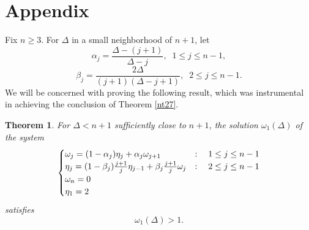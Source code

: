\documentclass[amssymb,amsfonts,12pt]{amsart}
\newtheorem{theorem}{Theorem}[section]
\begin{document}
\section{Appendix}
Fix $n\ge 3$. For $\Delta$ in a small neighborhood of $n+1$, let
$$\alpha_j=\frac{\Delta-(j+1)}{\Delta-j},\;\;1\le j\le n-1,$$
$$\beta_j=\frac{2\Delta}{(j+1)(\Delta-j+1)},\;\;2\le j\le n-1.$$
We will be concerned with proving the following result, which was instrumental in achieving the conclusion of Theorem \ref{nt27}.



\begin{theorem}
\label{tApe}
For $\Delta<n+1$ sufficiently close to $n+1$, the solution $\omega_1(\Delta)$ of
the system
\begin{equation}
\label{ne147}
\begin{cases}\omega_j=(1-\alpha_j)\eta_j+\alpha_j\omega_{j+1}&:\quad 1\le j\le n-1\\ \hfill \eta_j=(1-\beta_j)\frac{j+1}{j}\eta_{j-1}+\beta_j\frac{j+1}{j}\omega_{j}&:\quad 2\le j\le n-1 \\  \omega_n=0\\\eta_1=2\end{cases}
\end{equation}
satisfies
$$\omega_1(\Delta)>1.$$
\end{theorem}
\end{document}
